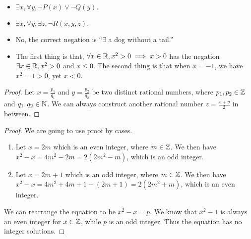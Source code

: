 \documentclass[8pt,twocolumn]{article}
\begin{document}
\begin{Answer}[number=2.3.3]
  \begin{itemize}
    \item $\exists x, \forall y, \neg P(x) \lor \neg Q(y).$
    \item $\exists x, \forall y, \exists z, \neg R(x,y,z).$
  \end{itemize}
\end{Answer}

\begin{Answer}[number=2.3.4]
  \begin{itemize}
    \item No, the correct negation is ``$\exists$ a dog without a tail.''
    \item The first thing is that, $\forall x\in\mathbb{R}, x^2>0\implies x>0$ has the negation $\exists x\in
      \mathbb{R}, x^2>0$ and $x\le 0$. The second thing is that when $x = -1$, we have
      $x^2 = 1 > 0$, yet $x<0$.
  \end{itemize}
\end{Answer}

\begin{Answer}[number=2.3.7]
  \begin{proof}
    Let $x=\frac{p_1}{q_1}$ and $y=\frac{p_2}{q_2}$ be two distinct rational
    numbers, where $p_1,p_2\in \mathbb{Z}$ and $q_1,q_2\in \mathbb{N}$. We can always construct
    another rational number $z=\frac{x+y}{2}$ in between.
  \end{proof}
\end{Answer}

\begin{Answer}[number=2.3.8]
  \begin{proof}
    We are going to use proof by cases.
    \begin{enumerate}
      \item Let $x = 2m$ which is an even integer, where $m\in\mathbb{Z}$. We then have
        $x^2-x = 4m^2 - 2m = 2(2m^2 - m)$, which is an odd integer.
      \item Let $x = 2m+1$ which is an odd integer, where $m\in\mathbb{Z}$. We then have
        $x^2-x = 4m^2 + 4m + 1 - (2m + 1) = 2(2m^2 + m)$, which is an even integer.
    \end{enumerate}
    We can rearrange the equation to be $x^2-x=p$. We know that $x^2-1$ is always
    an even integer for $x\in\mathbb{Z}$, while $p$ is an odd integer. Thus the
    equation has no integer solutions.
  \end{proof}
\end{Answer}
\end{document}
